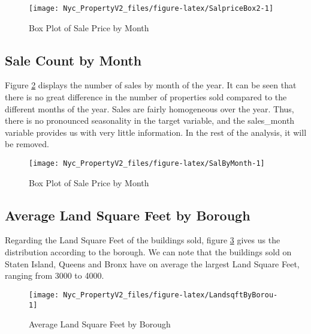 \documentclass[
]{article}
\begin{document}
\begin{figure}[H]

{\centering \texttt{[image: Nyc\_PropertyV2\_files/figure-latex/SalpriceBox2-1]} 

}

\caption{Box Plot of Sale Price by Month}\label{fig:SalpriceBox2}
\end{figure}

\hypertarget{sale-count-by-month}{%
\subsection{Sale Count by Month}\label{sale-count-by-month}}

Figure \ref{fig:SalByMonth} displays the number of sales by month of the year. It can be seen that there is no great difference in the number of properties sold compared to the different months of the year. Sales are fairly homogeneous over the year. Thus, there is no pronounced seasonality in the target variable, and the sales\_month variable provides us with very little information. In the rest of the analysis, it will be removed.

\begin{figure}[H]

{\centering \texttt{[image: Nyc\_PropertyV2\_files/figure-latex/SalByMonth-1]} 

}

\caption{Box Plot of Sale Price by Month}\label{fig:SalByMonth}
\end{figure}

\hypertarget{average-land-square-feet-by-borough}{%
\subsection{Average Land Square Feet by Borough}\label{average-land-square-feet-by-borough}}

Regarding the Land Square Feet of the buildings sold, figure \ref{fig:LandsqftByBorou} gives us the distribution according to the borough. We can note that the buildings sold on Staten Island, Queens and Bronx have on average the largest Land Square Feet, ranging from 3000 to 4000.

\begin{figure}[H]

{\centering \texttt{[image: Nyc\_PropertyV2\_files/figure-latex/LandsqftByBorou-1]} 

}

\caption{Average Land Square Feet by Borough}\label{fig:LandsqftByBorou}
\end{figure}
\end{document}

